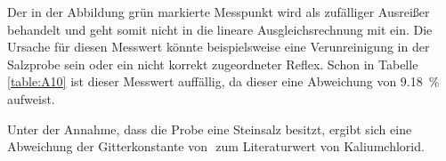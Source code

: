 

Der in der Abbildung grün markierte Messpunkt wird als zufälliger Ausreißer behandelt und geht somit nicht in die lineare Ausgleichsrechnung mit ein. Die Ursache für diesen Messwert könnte beispielsweise eine Verunreinigung in der Salzprobe sein oder ein nicht korrekt zugeordneter Reflex. Schon in Tabelle \ref{table:A10} ist dieser Messwert auffällig, da dieser eine Abweichung von \SI{9.18}{\percent} aufweist.

Unter der Annahme, dass die Probe eine Steinsalz besitzt, ergibt sich eine Abweichung der Gitterkonstante von $$ zum Literaturwert \cite{Kaliumchlorid} von Kaliumchlorid.








